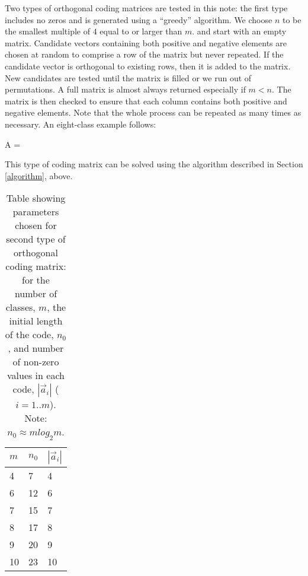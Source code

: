 
Two types of orthogonal coding matrices are tested in this note:
the first type includes no zeros and is generated
using a ``greedy'' algorithm.
We choose $n$ to be the smallest multiple of $4$ equal to or larger than $m$.
and start with an empty matrix.
Candidate vectors containing both positive and negative elements 
are chosen at random to comprise a row of the matrix but never repeated.
If the candidate vector is orthogonal to existing rows, then it is added to the matrix.
New candidates are tested until the matrix is filled or we run out of permutations.
A full matrix is almost always returned especially if $m<n$.
The matrix is then checked to ensure that 
each column contains both positive and negative elements.
Note that the whole process can be repeated as many times as necessary.
An eight-class example follows:
\begin{eqnnon}
	A = 
\end{eqnnon}
This type of coding matrix can be solved using the algorithm described
in Section \ref{algorithm}, above.

\begin{table}
	\caption{Table showing parameters chosen for second type of
	orthogonal coding matrix: for the number of classes, $m$, 
	the initial length of the code, $n_0$, and number of non-zero
	values in each code, $|\vec a_i|$ ($i=1..m$). 
	Note: $n_0 \approx m log_2 m$.}\label{ortho_param}
	\begin{tabular}{l|ll}
		$m$ & $n_0$ & $|\vec a_i|$ \\
		\hline
		4 & 7 & 4 \\
		6 & 12 & 6 \\
		7 & 15 & 7 \\
		8 & 17 & 8 \\
		9 & 20 & 9 \\
		10 & 23 & 10 \\
	\end{tabular}
\end{table}

